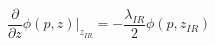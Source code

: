 \begin{equation}
\frac {\partial} {\partial z}\phi(p,z)\Big|_{z_{IR}}=-\frac
{\lambda_{IR}} 2 \phi(p,z_{IR}) \label{bc}
\end{equation}

